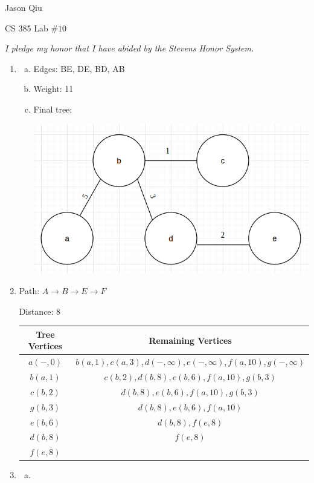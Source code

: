 \documentclass[a4paper,10pt]{article}
\begin{document}
Jason Qiu

CS 385 Lab $\#10$

\emph{I pledge my honor that I have abided by the Stevens Honor System.}

\begin{enumerate}[1.]
	\item \begin{enumerate}[(a)]
		\item Edges: BE, DE, BD, AB
		\item Weight: 11
		\item Final tree:
		
		\centerline{\includegraphics[scale=0.5]{fig1}}	
	\end{enumerate}
	\item Path: $A \rightarrow B \rightarrow E \rightarrow F$
	
	Distance: 8
	
	\begin{tabular}{|c|c|}
	\hline
	\textbf{Tree Vertices} & \textbf{Remaining Vertices} \\
	\hline
	$a(-, 0)$ & $b(a, 1), c(a, 3), d(-, \infty), e(-, \infty), f(a, 10), g(-, \infty)$\\
	\hline
	$b(a, 1)$ & $c(b, 2), d(b, 8), e(b, 6), f(a, 10), g(b, 3)$\\
	\hline
	$c(b, 2)$ & $d(b, 8), e(b, 6), f(a, 10), g(b, 3)$\\
	\hline
	$g(b, 3)$ & $d(b, 8), e(b, 6), f(a, 10)$\\
	\hline
	$e(b, 6)$ & $d(b, 8), f(e, 8)$\\
	\hline
	$d(b, 8)$ & $f(e, 8)$\\
	\hline
	$f(e, 8)$ & \\
	\hline
	\end{tabular}
	
	\item \begin{enumerate}[(a)]
		\item \ 
		

\end{enumerate}
\end{enumerate}
\end{document}
